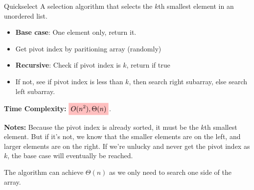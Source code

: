 \begin{knBox}
    {Quickselect}
    A selection algorithm that selects the $k$th smallest element in an unordered list.
    \begin{itemize}
        \item \textbf{Base case}: One element only, return it.
        \item Get pivot index by paritioning array (randomly)
        \item \textbf{Recursive}: Check if pivot index is $k$, return if true
        \item If not, see if pivot index is less than $k$, then search right subarray, else search left subarray.
    \end{itemize}

    \textbf{Time Complexity:} $\mathcolorbox{pink}{O(n^2),\Theta(n)}$.

    \textbf{Notes:} Because the pivot index is already sorted, it must be the $k$th smallest element. But if it's not, we know that the smaller elements are on the left, and larger elements are on the right. If we're unlucky and never get the pivot index as $k$, the base case will eventually be reached.

    The algorithm can achieve $\Theta(n)$ as we only need to search one side of the array.
\end{knBox}